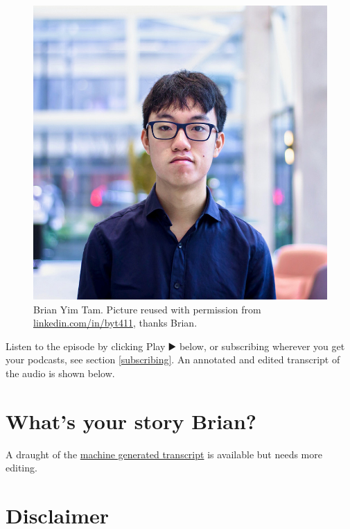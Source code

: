 \documentclass[
]{book}
\begin{document}
\begin{figure}

{\centering \includegraphics[width=1\linewidth]{images/brian} 

}

\caption{Brian Yim Tam. Picture reused with permission from \href{hhttps://www.linkedin.com/in/byt411/}{linkedin.com/in/byt411}, thanks Brian.}\label{fig:brian-fig}
\end{figure}



Listen to the episode by clicking Play ▶️ below, or subscribing wherever you get your podcasts, see section \ref{subscribing}. An annotated and edited transcript of the audio is shown below.

\hypertarget{brian-story}{%
\section{What's your story Brian?}\label{brian-story}}

A draught of the \href{https://github.com/dullhunk/cdyf/blob/master/23-brian.md}{machine generated transcript} is available but needs more editing.

\hypertarget{disclaimer-1}{%
\section{Disclaimer}\label{disclaimer-1}}
\end{document}

